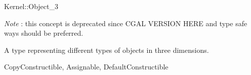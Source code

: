 \begin{ccRefConcept}{Kernel::Object_3}
\begin{ccDeprecated}
{\em Note} : this concept is deprecated since CGAL VERSION HERE and type safe ways should be preferred. 

A type representing different types of objects in three dimensions.

\ccRefines
CopyConstructible, Assignable, DefaultConstructible 

\ccSeeAlso
{} \\
 \\
 \\
 \\

\end{ccDeprecated}
\end{ccRefConcept}
